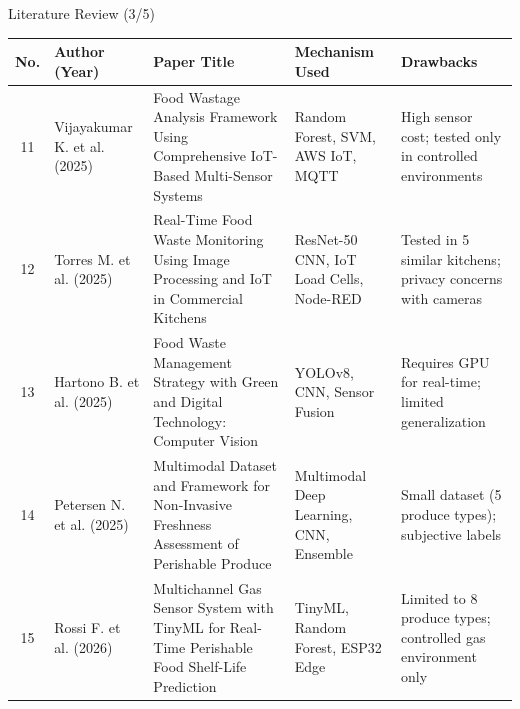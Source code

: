 \documentclass[aspectratio=169,xcolor=dvipsnames]{beamer}
\begin{document}
\begin{frame}{Literature Review (3/5)}
\scriptsize
\renewcommand{\arraystretch}{1.25}
\setlength{\tabcolsep}{2.5pt}

\begin{tabular}{|c|p{1.7cm}|p{3.6cm}|p{3.1cm}|p{3.2cm}|}
\hline
\textbf{No.} &
\textbf{Author (Year)} &
\textbf{Paper Title} &
\textbf{Mechanism Used} &
\textbf{Drawbacks} \\
\hline

11 &
Vijayakumar K. et al. (2025) &
Food Wastage Analysis Framework Using Comprehensive IoT-Based Multi-Sensor Systems &
Random Forest, SVM, AWS IoT, MQTT &
High sensor cost; tested only in controlled environments \\
\hline

12 &
Torres M. et al. (2025) &
Real-Time Food Waste Monitoring Using Image Processing and IoT in Commercial Kitchens &
ResNet-50 CNN, IoT Load Cells, Node-RED &
Tested in 5 similar kitchens; privacy concerns with cameras \\
\hline

13 &
Hartono B. et al. (2025) &
Food Waste Management Strategy with Green and Digital Technology: Computer Vision &
YOLOv8, CNN, Sensor Fusion &
Requires GPU for real-time; limited generalization \\
\hline

14 &
Petersen N. et al. (2025) &
Multimodal Dataset and Framework for Non-Invasive Freshness Assessment of Perishable Produce &
Multimodal Deep Learning, CNN, Ensemble &
Small dataset (5 produce types); subjective labels \\
\hline

15 &
Rossi F. et al. (2026) &
Multichannel Gas Sensor System with TinyML for Real-Time Perishable Food Shelf-Life Prediction &
TinyML, Random Forest, ESP32 Edge &
Limited to 8 produce types; controlled gas environment only \\
\hline

\end{tabular}
\end{frame}
\end{document}
